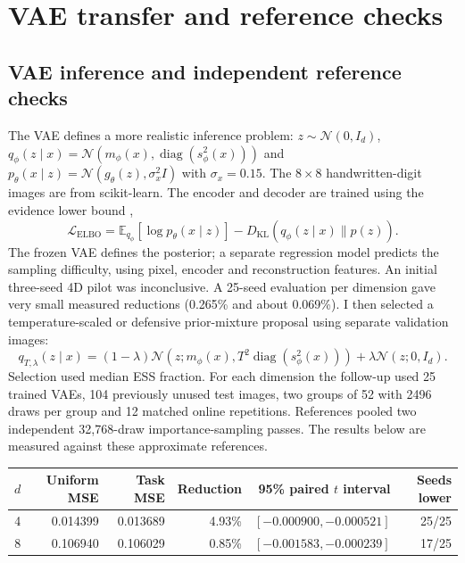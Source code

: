 \documentclass[10pt,letterpaper]{article}
\newcommand{\E}{\mathbb E}
\newcommand{\N}{\mathcal N}
\newcommand{\KL}{D_{\mathrm{KL}}}
\begin{document}
\section{VAE transfer and reference checks}\label{app:vae}
\subsection{VAE inference and independent reference checks}
The VAE defines a more realistic inference problem: $z\sim\N(0,I_d)$, $q_\phi(z\mid x)=\N(m_\phi(x),\operatorname{diag}(s_\phi^2(x)))$ and $p_\theta(x\mid z)=\N(g_\theta(z),\sigma_x^2 I)$ with $\sigma_x=0.15$. The $8\times8$ handwritten-digit images are from scikit-learn. The encoder and decoder are trained using the evidence lower bound \cite{kingma2014},
\begin{equation}
 \mathcal L_{\mathrm{ELBO}}=\E_{q_\phi}[\log p_\theta(x\mid z)]-\KL(q_\phi(z\mid x)\|p(z)).
\end{equation}
The frozen VAE defines the posterior; a separate regression model predicts the sampling difficulty, using pixel, encoder and reconstruction features. An initial three-seed 4D pilot was inconclusive. A 25-seed evaluation per dimension gave very small measured reductions (0.265\% and about 0.069\%). I then selected a temperature-scaled or defensive prior-mixture proposal using separate validation images:
\begin{equation}
 q_{T,\lambda}(z\mid x)=(1-\lambda)\N(z;m_\phi(x),T^2\operatorname{diag}(s_\phi^2(x)))+\lambda\N(z;0,I_d).
\end{equation}
Selection used median ESS fraction. For each dimension the follow-up used 25 trained VAEs, 104 previously unused test images, two groups of 52 with 2496 draws per group and 12 matched online repetitions. References pooled two independent 32,768-draw importance-sampling passes. The results below are measured against these approximate references.
\begin{center}\begin{minipage}{\linewidth}\centering\small
\begin{tabular}{@{}r rrr r r@{}}
\toprule
$d$ & Uniform MSE & Task MSE & Reduction & 95\% paired $t$ interval & Seeds lower\\
\midrule
4&0.014399&0.013689&4.93\%&$[-0.000900,-0.000521]$&25/25\\
8&0.106940&0.106029&0.85\%&$[-0.001583,-0.000239]$&17/25\\
\bottomrule
\end{tabular}
\end{minipage}\end{center}
\end{document}

